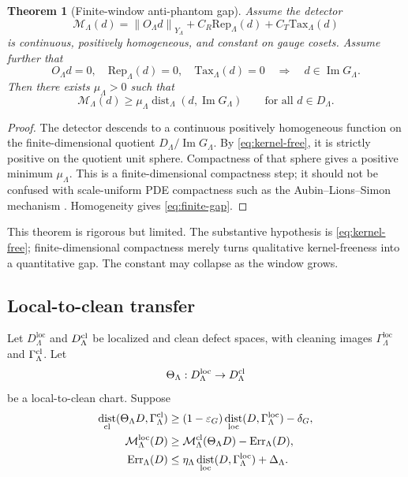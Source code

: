 \documentclass[11pt]{article}
\numberwithin{equation}{section}
\newtheorem{theorem}{Theorem}[section]
\theoremstyle{remark}
\DeclareMathOperator{\dist}{dist}
\newcommand{\eps}{\varepsilon}
\newcommand{\loc}{\mathrm{loc}}
\newcommand{\norm}[2]{\left\|#1\right\|_{#2}}
\newcommand{\Tax}{\mathrm{Tax}}
\newcommand{\Rep}{\mathrm{Rep}}
\newcommand{\Err}{\mathrm{Err}}
\newcommand{\calM}{\mathcal M}
\begin{document}
\begin{theorem}[Finite-window anti-phantom gap]\label{thm:finite-gap}
Assume the detector
\begin{equation}\label{eq:detector-size}
\calM_\Lambda(d)
=\norm{O_\Lambda d}{Y_\Lambda}
+C_R\Rep_\Lambda(d)+C_T\Tax_\Lambda(d)
\end{equation}
is continuous, positively homogeneous, and constant on gauge cosets. Assume further that
\begin{equation}\label{eq:kernel-free}
O_\Lambda d=0,
\quad
\Rep_\Lambda(d)=0,
\quad
\Tax_\Lambda(d)=0
\quad\Longrightarrow\quad
d\in\operatorname{Im}G_\Lambda.
\end{equation}
Then there exists $\mu_\Lambda>0$ such that
\begin{equation}\label{eq:finite-gap}
\calM_\Lambda(d)
\ge
\mu_\Lambda\dist_\Lambda(d,\operatorname{Im}G_\Lambda)
\qquad
\text{for all }d\in D_\Lambda.
\end{equation}
\end{theorem}

\begin{proof}
The detector descends to a continuous positively homogeneous function on the finite-dimensional quotient $D_\Lambda/\operatorname{Im}G_\Lambda$. By \eqref{eq:kernel-free}, it is strictly positive on the quotient unit sphere. Compactness of that sphere gives a positive minimum $\mu_\Lambda$. This is a finite-dimensional compactness step; it should not be confused with scale-uniform PDE compactness such as the Aubin--Lions--Simon mechanism \cite{Simon1986}. Homogeneity gives \eqref{eq:finite-gap}.
\end{proof}

This theorem is rigorous but limited. The substantive hypothesis is \eqref{eq:kernel-free}; finite-dimensional compactness merely turns qualitative kernel-freeness into a quantitative gap. The constant may collapse as the window grows.

\subsection{Local-to-clean transfer}

Let $D_\Lambda^{\loc}$ and $D_\Lambda^{\rm cl}$ be localized and clean defect spaces, with cleaning images $\Gamma_\Lambda^{\loc}$ and $\Gamma_\Lambda^{\rm cl}$. Let
\[
\Theta_\Lambda:D_\Lambda^{\loc}\to D_\Lambda^{\rm cl}
\]
be a local-to-clean chart. Suppose
\begin{align}
\dist_{\rm cl}(\Theta_\Lambda D,\Gamma_\Lambda^{\rm cl})
&\ge (1-\eps_G)\dist_{\loc}(D,\Gamma_\Lambda^{\loc})-\delta_G,\label{eq:quot-lift}\\
\calM_\Lambda^{\loc}(D)
&\ge \calM_\Lambda^{\rm cl}(\Theta_\Lambda D)-\Err_\Lambda(D),\label{eq:det-compare}\\
\Err_\Lambda(D)
&\le \eta_\Lambda\dist_{\loc}(D,\Gamma_\Lambda^{\loc})+\Delta_\Lambda.
\label{eq:err-budget}
\end{align}
\end{document}

